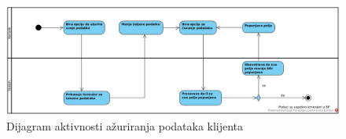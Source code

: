 \begin{figure}[H]
\begin{center}
\includegraphics[width=\textwidth]{Pictures/activity_update_user_profile.png}
\end{center}
    \caption{Dijagram aktivnosti ažuriranja podataka klijenta}
\label{fig:ActivityUpdateUserProfile}
\end{figure}
